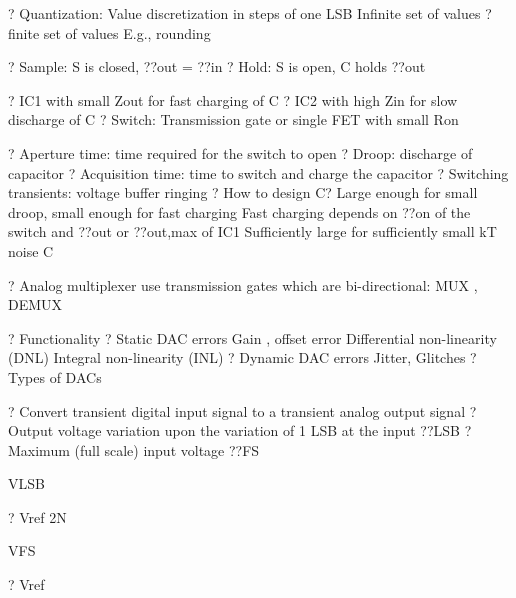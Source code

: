 \documentclass[2pt,landscape]{article}
\begin{document}
\begin{multicols*}{5}
?	Quantization:
\textbullet 	Value discretization in steps of one LSB
\textbullet 	Infinite set of values ? finite set of values
\textbullet 	E.g., rounding
















?	Sample: S is closed, ??out = ??in
?	Hold: S is open, C holds ??out

?	IC1 with small Zout for fast charging of C
?	IC2 with high Zin for slow discharge of C
?	Switch: Transmission gate or single FET with small Ron



?	Aperture time:
time required for the 
switch to open
?	Droop: discharge 
of capacitor
?	Acquisition time: 
time to switch and 
charge the capacitor
?	Switching transients: 
voltage buffer ringing
?	How to design C?
\textbullet 	Large enough for small droop, small enough for fast charging
\textbullet 	Fast charging depends on ??on of the switch and ??out or ??out,max of IC1
\textbullet 	Sufficiently large for sufficiently small kT noise
C







?	Analog multiplexer use transmission gates which are bi-directional: 
MUX , DEMUX



?	Functionality
?	Static DAC errors
\textbullet 	Gain , offset error
\textbullet 	Differential non-linearity (DNL)
\textbullet 	Integral non-linearity (INL)
?	Dynamic DAC errors
\textbullet 	Jitter, Glitches
?	Types of DACs



?	Convert transient digital input signal to a transient analog output signal
?	Output voltage variation upon the variation of 1 LSB at the input ??LSB
?	Maximum (full scale) input voltage ??FS









VLSB


? Vref
2N



VFS



? Vref




\end{multicols*}
\end{document}
